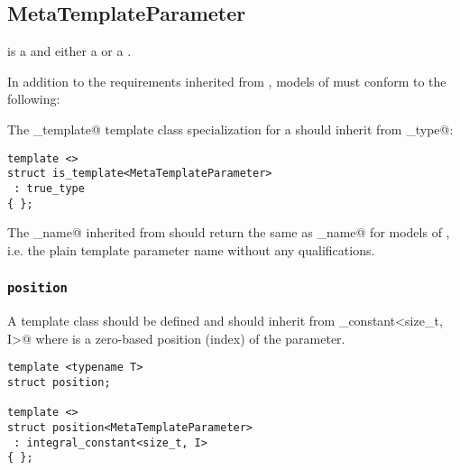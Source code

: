 \subsection{MetaTemplateParameter}
\label{concept-MetaTemplateParameter}



 is a  and either a  or a .

In addition to the requirements inherited from ,
models of  must conform to the following:

The \verb@is_template@ template class specialization for a  should
inherit from \verb@true_type@:

\begin{verbatim}
template <>
struct is_template<MetaTemplateParameter>
 : true_type
{ };
\end{verbatim}

The \verb@full_name@ inherited from  should return the same 
as \verb@base_name@ for models of , i.e. the plain template parameter
name without any qualifications.

\subsubsection{\texttt{position}}

A template class \verb@position@ should be defined and should
inherit from \verb@integral_constant<size_t, I>@ where \verb@I@ is
a zero-based position (index) of the parameter.

\begin{verbatim}
template <typename T>
struct position;

template <>
struct position<MetaTemplateParameter>
 : integral_constant<size_t, I>
{ };
\end{verbatim}

